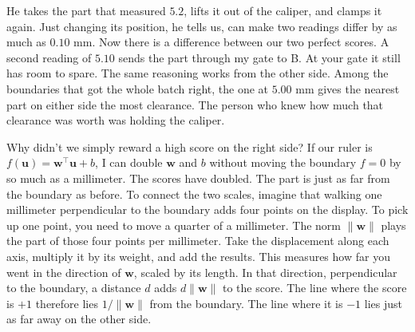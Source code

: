 \documentclass[12pt,oneside]{article}
\begin{document}
He takes the part that measured $5.2$, lifts it out of the caliper, and clamps it again. Just changing its position, he tells us, can make two readings differ by as much as $0.10$ mm. Now there is a difference between our two perfect scores. A second reading of $5.10$ sends the part through my gate to B. At your gate it still has room to spare. The same reasoning works from the other side. Among the boundaries that got the whole batch right, the one at $5.00$ mm gives the nearest part on either side the most clearance. The person who knew how much that clearance was worth was holding the caliper.

Why didn't we simply reward a high score on the right side? If our ruler is $f(\boldsymbol u)=\boldsymbol w^\top\boldsymbol u+b$, I can double $\boldsymbol w$ and $b$ without moving the boundary $f=0$ by so much as a millimeter. The scores have doubled. The part is just as far from the boundary as before. To connect the two scales, imagine that walking one millimeter perpendicular to the boundary adds four points on the display. To pick up one point, you need to move a quarter of a millimeter. The norm $\lVert\boldsymbol w\rVert$ plays the part of those four points per millimeter. Take the displacement along each axis, multiply it by its weight, and add the results. This measures how far you went in the direction of $\boldsymbol w$, scaled by its length. In that direction, perpendicular to the boundary, a distance $d$ adds $d\lVert\boldsymbol w\rVert$ to the score. The line where the score is $+1$ therefore lies $1/\lVert\boldsymbol w\rVert$ from the boundary. The line where it is $-1$ lies just as far away on the other side.
\end{document}
